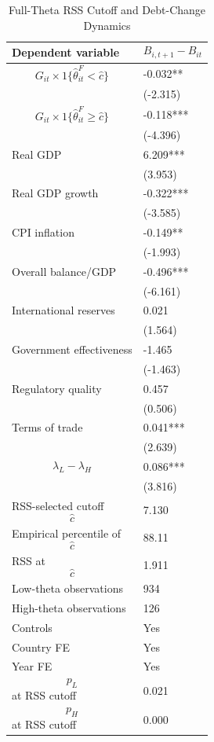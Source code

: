 \begin{table}[H]\centering
\begin{threeparttable}
\caption{Full-Theta RSS Cutoff and Debt-Change Dynamics}
\label{tab:deltaB_rss_cutoff_fulltheta}
\scriptsize
\begin{tabularx}{\textwidth}{lY}
\toprule
Dependent variable & $$B_{i,t+1}-B_{it}$$ \\
\midrule
$$G_{it}\times 1\{\widehat{\theta}^{F}_{it}<\widehat{c}\}$$ & -0.032** \\
 & (-2.315) \\
$$G_{it}\times 1\{\widehat{\theta}^{F}_{it}\geq\widehat{c}\}$$ & -0.118*** \\
 & (-4.396) \\
Real GDP & 6.209*** \\
 & (3.953) \\
Real GDP growth & -0.322*** \\
 & (-3.585) \\
CPI inflation & -0.149** \\
 & (-1.993) \\
Overall balance/GDP & -0.496*** \\
 & (-6.161) \\
International reserves & 0.021 \\
 & (1.564) \\
Government effectiveness & -1.465 \\
 & (-1.463) \\
Regulatory quality & 0.457 \\
 & (0.506) \\
Terms of trade & 0.041*** \\
 & (2.639) \\
$$\lambda_L-\lambda_H$$ & 0.086*** \\
 & (3.816) \\
\midrule
RSS-selected cutoff $$\widehat{c}$$ & 7.130 \\
Empirical percentile of $$\widehat{c}$$ & 88.11 \\
RSS at $$\widehat{c}$$ & 1.911 \\
Low-theta observations & 934 \\
High-theta observations & 126 \\
Controls & Yes \\
Country FE & Yes \\
Year FE & Yes \\
$$p_L$$ at RSS cutoff & 0.021 \\
$$p_H$$ at RSS cutoff & 0.000 \\

\end{tabularx}
\end{threeparttable}
\end{table}
